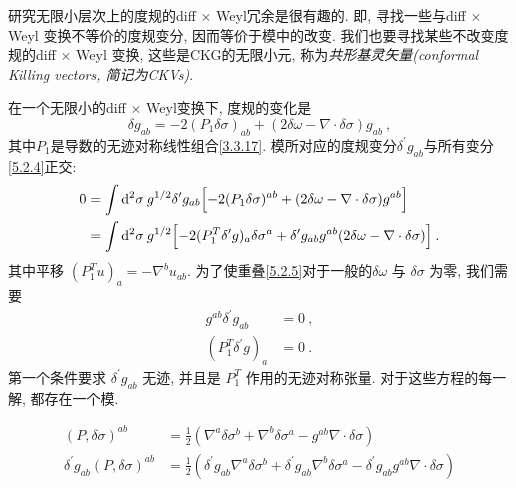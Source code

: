研究无限小层次上的度规的diff $\times$ Weyl冗余是很有趣的. 即, 寻找一些与diff $\times$ Weyl 变换不等价的度规变分, 因而等价于模中的改变. 
我们也要寻找某些不改变度规的diff $\times$ Weyl 变换, 这些是CKG的无限小元, 称为\emph{共形基灵矢量(conformal Killing vectors, 简记为CKVs)}. 

在一个无限小的diff $\times$ Weyl变换下, 度规的变化是
\begin{equation}
	\delta g_{a b}=-2(P_{1} \delta \sigma)_{a b}+(2 \delta \omega-\nabla \cdot \delta \sigma) g_{a b} \:, \label{5.2.4}
\end{equation}
其中$P_{1}$是导数的无迹对称线性组合\eqref{3.3.17}. 模所对应的度规变分$\delta^{\prime} g_{a b}$与所有变分\eqref{5.2.4}正交:
	\begin{align}
		0 &=\int \mathrm{d}^{2} \sigma \: g^{1 / 2} \delta^{\prime} g_{a b}\Bigl[-2(P_{1} \delta \sigma)^{a b}+(2 \delta \omega-\nabla \cdot \delta \sigma) g^{a b}\Bigr]  \nonumber \\
		&=\int \mathrm{d}^{2} \sigma \: g^{1 / 2}\Bigl[-2(P_{1}^{T} \delta^{\prime} g)_{a} \delta \sigma^{a}+\delta^{\prime} g_{a b} g^{a b}(2 \delta \omega-\nabla \cdot \delta \sigma)\Bigr] \:. \label{5.2.5}
	\end{align}
其中平移 $(P_{1}^{T} u)_{a}=-\nabla^{b} u_{a b}$. 为了使重叠\eqref{5.2.5}对于一般的$\delta \omega$ 与 $\delta \sigma$ 为零, 我们需要
\begin{subequations} \label{5.2.6}
\begin{align}
g^{a b} \delta^{\prime} g_{a b} &=0  \:, \label{5.2.6a} \\
(P_{1}^{T} \delta^{\prime} g)_{a} &=0 \:. \label{5.2.6b}
\end{align}			
\end{subequations}
第一个条件要求 $\delta^{\prime} g_{a b}$ 无迹, 并且是 $P_{1}^{T}$ 作用的无迹对称张量. 对于这些方程的每一解, 都存在一个模.

\begin{tcolorbox}
	\begin{remark}
		\begin{align*}
			(P, \delta \sigma)^{a b}&=\frac{1}{2}(\nabla^{a} \delta \sigma^{b}+\nabla^{b} \delta \sigma^{a}-g^{a b} \nabla \cdot \delta \sigma) \\
			\delta^{\prime} g_{a b}(P, \delta \sigma)^{a b}&=\frac{1}{2}(\delta^{\prime} g_{a b} \nabla^{a} \delta \sigma^{b}+\delta^{\prime} g_{a b} \nabla^{b} \delta \sigma^{a}-\delta^{\prime} g_{a b} g^{a b} \nabla \cdot \delta \sigma)
			\end{align*}
	\end{remark}
\end{tcolorbox}

